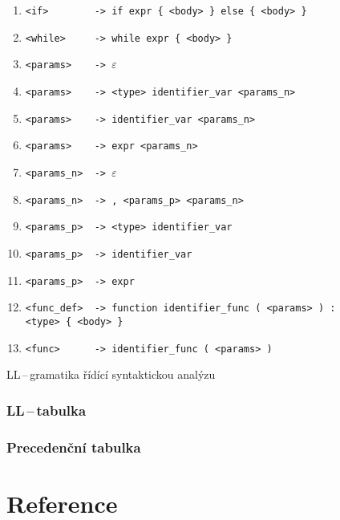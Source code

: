 \documentclass[a4paper,12pt]{article}
\begin{document}
\begin{table}[!ht]
\begin{enumerate}[noitemsep]
		\item \verb|<if>        -> if expr { <body> } else { <body> }|
		\item \verb|<while>     -> while expr { <body> }|
		      		      		      		      		      		         
		\item \verb|<params>    -> |$\varepsilon$
		\item \verb|<params>    -> <type> identifier_var <params_n>|
		\item \verb|<params>    -> identifier_var <params_n>|
		\item \verb|<params>    -> expr <params_n>|
		\item \verb|<params_n>  -> |$\varepsilon$
		\item \verb|<params_n>  -> , <params_p> <params_n>|
		      		      		      		      		      		      
		\item \verb|<params_p>  -> <type> identifier_var|
		\item \verb|<params_p>  -> identifier_var|
		\item \verb|<params_p>  -> expr|
		      		      		      		      		      		         
		\item \verb|<func_def>  -> function identifier_func ( <params> ) :| 
		      \newline \verb |               <type> { <body> }|
		\item \verb|<func>      -> identifier_func ( <params> )|
		      		      		      		      		      		         
	\end{enumerate}
	\caption{LL\,--\,gramatika řídící syntaktickou analýzu}
	\label{table:ll-gramatika}
\end{table}
\clearpage
  
\subsubsection{LL\,--\,tabulka}

\subsubsection{Precedenční tabulka}

\section{Reference}
\end{document}
